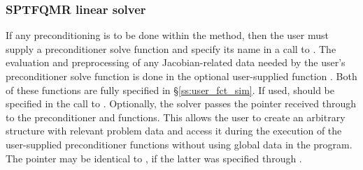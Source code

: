 \subsubsection{SPTFQMR linear solver}\label{sss:optin_sptfqmr}
If any preconditioning is to be done within the {\sptfqmr} method,
then the user must supply a preconditioner solve function 
and specify its name in a call to .
The evaluation and preprocessing of any Jacobian-related data needed
by the user's preconditioner solve function is done in the optional
user-supplied function . Both of these functions are
fully specified in \S\ref{ss:user_fct_sim}.
If used,  should be specified in the call to
.
Optionally, the {\cvsptfqmr} solver passes the pointer 
received through  to the preconditioner
 and  functions.  This allows the user to create
an arbitrary structure with relevant problem data and access it during
the execution of the user-supplied preconditioner functions without using
global data in the program.  The pointer  may be identical
to , if the latter was specified through .

